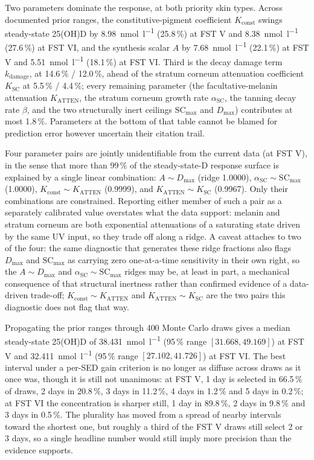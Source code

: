 \documentclass[11pt]{article}
\newcommand{\nmol}{\si{\nano\mole\per\litre}}
\newcommand{\SED}{SED}
\begin{document}
Two parameters dominate the response, at both priority skin types.
Across documented prior ranges, the constitutive-pigment coefficient
$K_{\mathrm{const}}$ swings steady-state 25(OH)D by 8.98~\nmol{}
(25.8\,\%) at FST V and 8.38~\nmol{} (27.6\,\%) at FST VI, and the
synthesis scalar $A$ by 7.68~\nmol{} (22.1\,\%) at FST V and
5.51~\nmol{} (18.1\,\%) at FST VI. Third is the decay damage term
$k_{\mathrm{damage}}$, at 14.6\,\% / 12.0\,\%, ahead of the stratum
corneum attenuation coefficient $K_{\mathrm{SC}}$ at 5.5\,\% / 4.4\,\%;
every remaining parameter (the facultative-melanin attenuation
$K_{\mathrm{ATTEN}}$, the stratum corneum growth rate
$\alpha_{\mathrm{SC}}$, the tanning decay rate $\beta$, and the two
structurally inert ceilings $\mathrm{SC}_{\max}$ and $D_{\max}$)
contributes at most 1.8\,\%. Parameters at the bottom of that table
cannot be blamed for prediction error however uncertain their citation
trail.

Four parameter pairs are jointly unidentifiable from the current data
(at FST V), in the sense that more than 99\,\% of the steady-state-D
response surface is explained by a single linear combination:
$A \sim D_{\max}$ (ridge 1.0000), $\alpha_{\mathrm{SC}} \sim
\mathrm{SC}_{\max}$ (1.0000), $K_{\mathrm{const}} \sim
K_{\mathrm{ATTEN}}$ (0.9999), and $K_{\mathrm{ATTEN}} \sim
K_{\mathrm{SC}}$ (0.9967). Only their combinations are constrained.
Reporting either member of such a pair as a separately calibrated
value overstates what the data support: melanin and stratum corneum
are both exponential attenuations of a saturating state driven by the
same UV input, so they trade off along a ridge. A caveat attaches to
two of the four: the same diagnostic that generates these ridge
fractions also flags $D_{\max}$ and $\mathrm{SC}_{\max}$ as carrying
zero one-at-a-time sensitivity in their own right, so the
$A \sim D_{\max}$ and $\alpha_{\mathrm{SC}} \sim \mathrm{SC}_{\max}$
ridges may be, at least in part, a mechanical consequence of that
structural inertness rather than confirmed evidence of a data-driven
trade-off; $K_{\mathrm{const}} \sim K_{\mathrm{ATTEN}}$ and
$K_{\mathrm{ATTEN}} \sim K_{\mathrm{SC}}$ are the two pairs this
diagnostic does not flag that way.

Propagating the prior ranges through 400 Monte Carlo draws gives a
median steady-state 25(OH)D of 38.431~\nmol{} (95\,\% range
$[31.668, 49.169]$) at FST V and 32.411~\nmol{} (95\,\% range
$[27.102, 41.726]$) at FST VI. The best interval under a per-\SED{}
gain criterion is no longer as diffuse across draws as it once was,
though it is still not unanimous: at FST V, 1 day is selected in
66.5\,\% of draws, 2 days in 20.8\,\%, 3 days in 11.2\,\%, 4 days in
1.2\,\% and 5 days in 0.2\,\%; at FST VI the concentration is sharper
still, 1 day in 89.8\,\%, 2 days in 9.8\,\% and 3 days in 0.5\,\%. The
plurality has moved from a spread of nearby intervals toward the
shortest one, but roughly a third of the FST V draws still select 2 or
3 days, so a single headline number would still imply more precision
than the evidence supports.
\end{document}
